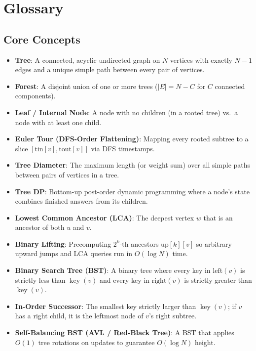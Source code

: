 \documentclass[11pt,a4paper]{article}
\theoremstyle{definition}
\begin{document}
\section{Glossary}
\label{sec:glossary}

\subsection*{Core Concepts}
\begin{itemize}[itemsep=2pt]
    \item \textbf{Tree}: A connected, acyclic undirected graph on $N$ vertices with exactly $N - 1$ edges and a unique simple path between every pair of vertices.
    \item \textbf{Forest}: A disjoint union of one or more trees ($|E| = N - C$ for $C$ connected components).
    \item \textbf{Leaf / Internal Node}: A node with no children (in a rooted tree) vs.\ a node with at least one child.
    \item \textbf{Euler Tour (DFS-Order Flattening)}: Mapping every rooted subtree to a slice $[\text{tin}[v], \text{tout}[v]]$ via DFS timestamps.
    \item \textbf{Tree Diameter}: The maximum length (or weight sum) over all simple paths between pairs of vertices in a tree.
    \item \textbf{Tree DP}: Bottom-up post-order dynamic programming where a node's state combines finished answers from its children.
    \item \textbf{Lowest Common Ancestor (LCA)}: The deepest vertex $w$ that is an ancestor of both $u$ and $v$.
    \item \textbf{Binary Lifting}: Precomputing $2^k$-th ancestors $\text{up}[k][v]$ so arbitrary upward jumps and LCA queries run in $O(\log N)$ time.
    \item \textbf{Binary Search Tree (BST)}: A binary tree where every key in $\text{left}(v)$ is strictly less than $\operatorname{key}(v)$ and every key in $\text{right}(v)$ is strictly greater than $\operatorname{key}(v)$.
    \item \textbf{In-Order Successor}: The smallest key strictly larger than $\operatorname{key}(v)$; if $v$ has a right child, it is the leftmost node of $v$'s right subtree.
    \item \textbf{Self-Balancing BST (AVL / Red-Black Tree)}: A BST that applies $O(1)$ tree rotations on updates to guarantee $O(\log N)$ height.
\end{itemize}
\end{document}

